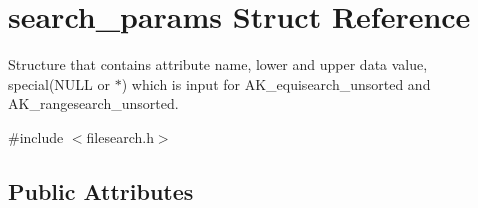 \hypertarget{structsearch__params}{\section{search\+\_\+params Struct Reference}
\label{structsearch__params}
}


Structure that contains attribute name, lower and upper data value, special(\+N\+U\+L\+L or $\ast$) which is input for A\+K\+\_\+equisearch\+\_\+unsorted and A\+K\+\_\+rangesearch\+\_\+unsorted.  




{\ttfamily \#include $<$filesearch.\+h$>$}

\subsection*{Public Attributes}

